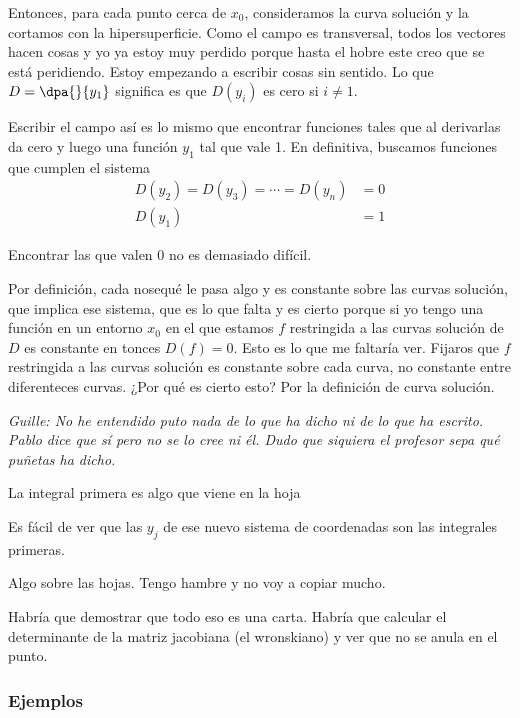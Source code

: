 Entonces, para cada punto cerca de $x_0$, consideramos la curva solución y la cortamos con la hipersuperficie. Como el campo es transversal, todos los vectores hacen cosas y yo ya estoy muy perdido porque hasta el hobre este creo que se está peridiendo. Estoy empezando a escribir cosas sin sentido. Lo que $D = \dpa{}{y_1}$ significa es que $D(y_i)$ es cero si $i ≠ 1$.

Escribir el campo así es lo mismo que encontrar funciones tales que al derivarlas da cero y luego una función $y_1$ tal que vale 1. En definitiva, buscamos funciones que cumplen el sistema
\begin{align*}
D(y_2) = D(y_3) = \dotsb = D(y_n) &= 0 \\
D(y_1) &= 1
\end{align*}

Encontrar las que valen $0$ no es demasiado difícil.

Por definición, cada nosequé le pasa algo y es constante sobre las curvas solución, que implica ese sistema, que es lo que falta y es cierto porque si yo tengo una función en un entorno $x_0$ en el que estamos $f$ restringida a las curvas solución de $D$ es constante en tonces $D(f) = 0$. Esto es lo que me faltaría ver. Fijaros que $f$ restringida a las curvas solución es constante sobre cada curva, no constante entre diferenteces curvas. ¿Por qué es cierto esto? Por la definición de curva solución.

\textit{Guille: No he entendido puto nada de lo que ha dicho ni de lo que ha escrito. Pablo dice que sí pero no se lo cree ni él. Dudo que siquiera el profesor sepa qué puñetas ha dicho.}

\seprule

\begin{defn} La integral primera es algo que viene en la hoja

\end{defn}

Es fácil de ver que las $y_j$ de ese nuevo sistema de coordenadas son las integrales primeras.

Algo sobre las hojas. Tengo hambre y no voy a copiar mucho.

Habría que demostrar que todo eso es una carta. Habría que calcular el determinante de la matriz jacobiana (el wronskiano) y ver que no se anula en el punto.

\subsubsection{Ejemplos}

